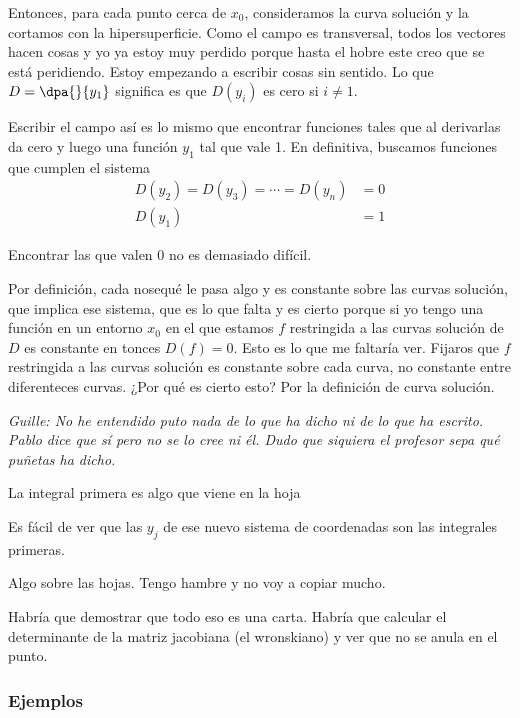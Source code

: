 Entonces, para cada punto cerca de $x_0$, consideramos la curva solución y la cortamos con la hipersuperficie. Como el campo es transversal, todos los vectores hacen cosas y yo ya estoy muy perdido porque hasta el hobre este creo que se está peridiendo. Estoy empezando a escribir cosas sin sentido. Lo que $D = \dpa{}{y_1}$ significa es que $D(y_i)$ es cero si $i ≠ 1$.

Escribir el campo así es lo mismo que encontrar funciones tales que al derivarlas da cero y luego una función $y_1$ tal que vale 1. En definitiva, buscamos funciones que cumplen el sistema
\begin{align*}
D(y_2) = D(y_3) = \dotsb = D(y_n) &= 0 \\
D(y_1) &= 1
\end{align*}

Encontrar las que valen $0$ no es demasiado difícil.

Por definición, cada nosequé le pasa algo y es constante sobre las curvas solución, que implica ese sistema, que es lo que falta y es cierto porque si yo tengo una función en un entorno $x_0$ en el que estamos $f$ restringida a las curvas solución de $D$ es constante en tonces $D(f) = 0$. Esto es lo que me faltaría ver. Fijaros que $f$ restringida a las curvas solución es constante sobre cada curva, no constante entre diferenteces curvas. ¿Por qué es cierto esto? Por la definición de curva solución.

\textit{Guille: No he entendido puto nada de lo que ha dicho ni de lo que ha escrito. Pablo dice que sí pero no se lo cree ni él. Dudo que siquiera el profesor sepa qué puñetas ha dicho.}

\seprule

\begin{defn} La integral primera es algo que viene en la hoja

\end{defn}

Es fácil de ver que las $y_j$ de ese nuevo sistema de coordenadas son las integrales primeras.

Algo sobre las hojas. Tengo hambre y no voy a copiar mucho.

Habría que demostrar que todo eso es una carta. Habría que calcular el determinante de la matriz jacobiana (el wronskiano) y ver que no se anula en el punto.

\subsubsection{Ejemplos}

